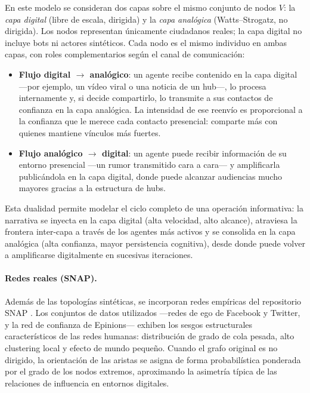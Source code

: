 En este modelo se consideran dos capas sobre el mismo conjunto de nodos $V$: la \emph{capa digital} (libre de escala, dirigida) y la \emph{capa analógica} (Watts–Strogatz, no dirigida). Los nodos representan únicamente ciudadanos reales; la capa digital no incluye bots ni actores sintéticos. Cada nodo es el mismo individuo en ambas capas, con roles complementarios según el canal de comunicación:

\begin{itemize}
  \item \textbf{Flujo digital $\to$ analógico}: un agente recibe contenido en la capa digital ---por ejemplo, un vídeo viral o una noticia de un hub---, lo procesa internamente y, si decide compartirlo, lo transmite a sus contactos de confianza en la capa analógica. La intensidad de ese reenvío es proporcional a la confianza que le merece cada contacto presencial: comparte más con quienes mantiene vínculos más fuertes.
  \item \textbf{Flujo analógico $\to$ digital}: un agente puede recibir información de su entorno presencial ---un rumor transmitido cara a cara--- y amplificarla publicándola en la capa digital, donde puede alcanzar audiencias mucho mayores gracias a la estructura de hubs.
\end{itemize}

Esta dualidad permite modelar el ciclo completo de una operación informativa: la narrativa se inyecta en la capa digital (alta velocidad, alto alcance), atraviesa la frontera inter-capa a través de los agentes más activos y se consolida en la capa analógica (alta confianza, mayor persistencia cognitiva), desde donde puede volver a amplificarse digitalmente en sucesivas iteraciones.

\paragraph{Redes reales (SNAP).}
Además de las topologías sintéticas, se incorporan redes empíricas del repositorio SNAP \cite{LeskovecKrevl2014}. Los conjuntos de datos utilizados ---redes de ego de Facebook y Twitter, y la red de confianza de Epinions--- exhiben los sesgos estructurales característicos de las redes humanas: distribución de grado de cola pesada, alto clustering local y efecto de mundo pequeño. Cuando el grafo original es no dirigido, la orientación de las aristas se asigna de forma probabilística ponderada por el grado de los nodos extremos, aproximando la asimetría típica de las relaciones de influencia en entornos digitales.
